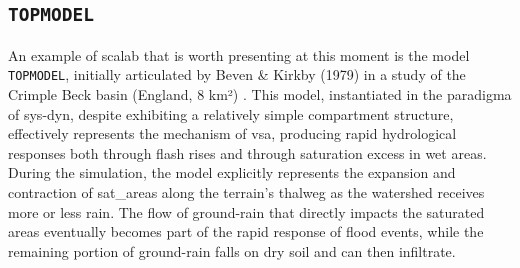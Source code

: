 \documentclass[./main_en.tex]{subfiles}
\begin{document}
\subsection{\texttt{TOPMODEL}} \label{sec:hydro:topmodel}

\par An example of \gls{scalab} that is worth presenting at this moment is the \gls{model} \texttt{TOPMODEL}, initially articulated by Beven \& Kirkby (1979) in a study of the Crimple Beck basin (England, 8 km²) \cite{Beven1979a}. This \gls{model}, instantiated in the \gls{paradigma} of \gls{sys-dyn}, despite exhibiting a relatively simple compartment structure, effectively represents the mechanism of \gls{vsa}, producing rapid hydrological responses both through flash rises and through saturation excess in wet areas. During the simulation, the \gls{model} explicitly represents the expansion and contraction of \gls{sat_areas} along the terrain's thalweg as the watershed receives more or less rain. The flow of \gls{ground-rain} that directly impacts the saturated areas eventually becomes part of the rapid response of flood events, while the remaining portion of \gls{ground-rain} falls on dry soil and can then infiltrate.
\end{document}
